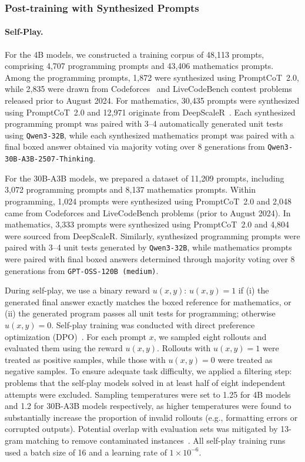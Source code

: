   
  \subsubsection{Post-training with Synthesized Prompts}
  \label{sec:details_post_train}
  \paragraph{Self-Play.} 
  For the 4B models, we constructed a training corpus of 48,113 prompts, comprising 4,707 programming prompts and 43,406 mathematics prompts. 
  Among the programming prompts, 1,872 were synthesized using PromptCoT~2.0, while 2,835 were drawn from Codeforces~\citep{penedo2025codeforces} and LiveCodeBench contest problems released prior to August 2024. 
  For mathematics, 30,435 prompts were synthesized using PromptCoT~2.0 and 12,971 originate from DeepScaleR~\citep{deepscaler2025}. 
  Each synthesized programming prompt was paired with 3–4 automatically generated unit tests using \texttt{Qwen3-32B}, while each synthesized mathematics prompt was paired with a final boxed answer obtained via majority voting over 8 generations from \texttt{Qwen3-30B-A3B-2507-Thinking}.
  
  For the 30B-A3B models, we prepared a dataset of 11,209 prompts, including 3,072 programming prompts and 8,137 mathematics prompts. 
  Within programming, 1,024 prompts were synthesized using PromptCoT~2.0 and 2,048 came from Codeforces and LiveCodeBench problems (prior to August 2024). 
  In mathematics, 3,333 prompts were synthesized using PromptCoT~2.0 and 4,804 were sourced from DeepScaleR. 
  Similarly, synthesized programming prompts were paired with 3–4 unit tests generated by \texttt{Qwen3-32B}, while mathematics prompts were paired with final boxed answers determined through majority voting over 8 generations from \texttt{GPT-OSS-120B (medium)}.
  
  During self-play, we use a binary reward $u(x,y)$: $u(x,y)=1$ if (i) the generated final answer exactly matches the boxed reference for mathematics, or (ii) the generated program passes all unit tests for programming; otherwise $u(x,y)=0$. 
  Self-play training was conducted with direct preference optimization (DPO)~\citep{rafailov2023direct}.  
  For each prompt $x$, we sampled eight rollouts and evaluated them using the reward $u(x,y)$.  
  Rollouts with $u(x,y)=1$ were treated as positive samples, while those with $u(x,y)=0$ were treated as negative samples.  
  To ensure adequate task difficulty, we applied a filtering step: problems that the self-play models solved in at least half of eight independent attempts were excluded. 
  Sampling temperatures were set to 1.25 for 4B models and 1.2 for 30B-A3B models respectively, as higher temperatures were found to substantially increase the proportion of invalid rollouts (e.g., formatting errors or corrupted outputs). 
  Potential overlap with evaluation sets was mitigated by 13-gram matching to remove contaminated instances~\citep{yang2024qwen2_5}. 
  All self-play training runs used a batch size of 16 and a learning rate of $1 \times 10^{-6}$. 
  
